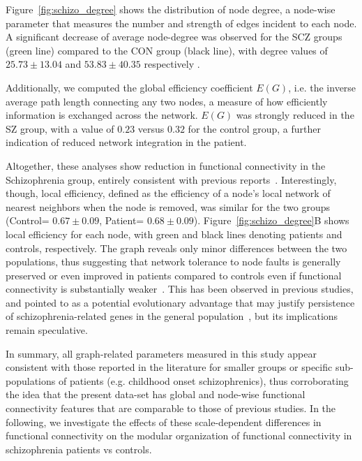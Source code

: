 Figure~\ref{fig:schizo_degree} shows the distribution of node degree, a node-wise parameter that measures the number and strength of edges incident to each node.
A significant decrease of average node-degree was observed for the SCZ groups (green line) compared to the CON group (black line), with degree values of $25.73 \pm 13.04$ and $53.83 \pm 40.35$ respectively .

Additionally, we computed the global efficiency coefficient $E(G)$, i.e.
the inverse average path length connecting any two nodes, a measure of how efficiently information is exchanged across the network.
$E(G)$ was strongly reduced in the SZ group, with a value of $0.23$ versus $0.32$ for the control group, a further indication of reduced network integration in the patient.

Altogether, these analyses show reduction in functional connectivity in the Schizophrenia group, entirely consistent with previous reports~\cite{liu2008,alexander-bloch2010,lerman-sinkoff2016}.
Interestingly, though, local efficiency, defined as the efficiency of a node's local network of nearest neighbors when the node is removed, was similar for the two groups (Control= $0.67\pm0.09$, Patient= $0.68\pm0.09$).
Figure~\ref{fig:schizo_degree}B shows local efficiency for each node, with green and black lines denoting patients and controls, respectively.
The graph reveals only minor differences between the two populations, thus suggesting that network tolerance to node faults is generally preserved or even improved in patients compared to controls even if functional connectivity is substantially weaker~\cite{lynall2010}.
This has been observed in previous studies, and pointed to as a potential evolutionary advantage that may justify persistence of schizophrenia-related genes in the general population~\cite{lynall2010}, but its implications remain speculative.

In summary, all graph-related parameters measured in this study appear consistent with those reported in the literature for smaller groups or specific sub-populations of patients (e.g. childhood onset schizophrenics), thus corroborating the idea that the present data-set has global and node-wise functional connectivity features that are comparable to those of previous studies.
In the following, we investigate the effects of these scale-dependent differences in functional connectivity on the modular organization of functional connectivity in schizophrenia patients vs controls.

